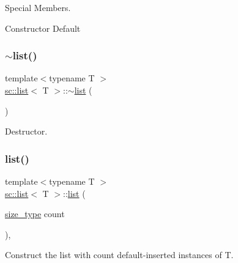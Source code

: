Special Members. 

Constructor Default \mbox{\label{classsc_1_1list_a3399256b9e2fa57bee383c2421722214}} 
\subsubsection{\texorpdfstring{$\sim$list()}{~list()}}
{\footnotesize\ttfamily template$<$typename T $>$ \\
\hyperlink{classsc_1_1list}{sc\+::list}$<$ T $>$\+::$\sim$\hyperlink{classsc_1_1list}{list} (\begin{DoxyParamCaption}{ }\end{DoxyParamCaption})\hspace{0.3cm}{\ttfamily [inline]}}



Destructor. 

\mbox{\label{classsc_1_1list_a38c946e7fe092c01ea0c0fc3be19d11c}} 
\subsubsection{\texorpdfstring{list()}{list()}\hspace{0.1cm}{\footnotesize\ttfamily [2/5]}}
{\footnotesize\ttfamily template$<$typename T $>$ \\
\hyperlink{classsc_1_1list}{sc\+::list}$<$ T $>$\+::\hyperlink{classsc_1_1list}{list} (\begin{DoxyParamCaption}\item[{\hyperlink{classsc_1_1list_acbac64cff34d45bb9c61771493db48ec}{size\+\_\+type}}]{count }\end{DoxyParamCaption})\hspace{0.3cm}{\ttfamily [inline]}, {\ttfamily [explicit]}}



Construct the list with count default-\/inserted instances of T. 

\mbox{\label{classsc_1_1list_a142545a98bc5fec38606bf7000620864}} 
